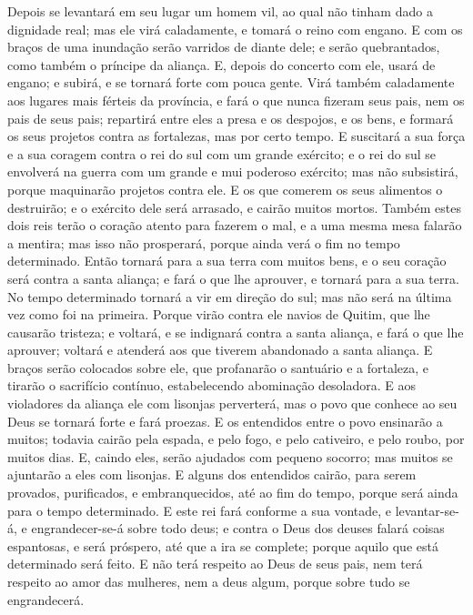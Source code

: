 Depois se levantará em seu lugar um homem vil, ao qual não tinham
dado a dignidade real; mas ele virá caladamente, e tomará o reino
com engano. E com os braços de uma inundação serão varridos
de diante dele; e serão quebrantados, como também o príncipe da
aliança. E, depois do concerto com ele, usará de engano; e
subirá, e se tornará forte com pouca gente. Virá também
caladamente aos lugares mais férteis da província, e fará o que
nunca fizeram seus pais, nem os pais de seus pais; repartirá entre
eles a presa e os despojos, e os bens, e formará os seus projetos
contra as fortalezas, mas por certo tempo. E suscitará a sua
força e a sua coragem contra o rei do sul com um grande exército; e
o rei do sul se envolverá na guerra com um grande e mui poderoso
exército; mas não subsistirá, porque maquinarão projetos contra ele.
E os que comerem os seus alimentos o destruirão; e o exército
dele será arrasado, e cairão muitos mortos. Também estes dois
reis terão o coração atento para fazerem o mal, e a uma mesma mesa
falarão a mentira; mas isso não prosperará, porque ainda verá o fim
no tempo determinado. Então tornará para a sua terra com
muitos bens, e o seu coração será contra a santa aliança; e fará o
que lhe aprouver, e tornará para a sua terra. No tempo
determinado tornará a vir em direção do sul; mas não será na última
vez como foi na primeira. Porque virão contra ele navios de
Quitim, que lhe causarão tristeza; e voltará, e se indignará contra
a santa aliança, e fará o que lhe aprouver; voltará e atenderá aos
que tiverem abandonado a santa aliança. E braços serão
colocados sobre ele, que profanarão o santuário e a fortaleza, e
tirarão o sacrifício contínuo, estabelecendo abominação desoladora.
E aos violadores da aliança ele com lisonjas perverterá, mas
o povo que conhece ao seu Deus se tornará forte e fará proezas.
E os entendidos entre o povo ensinarão a muitos; todavia
cairão pela espada, e pelo fogo, e pelo cativeiro, e pelo roubo, por
muitos dias. E, caindo eles, serão ajudados com pequeno
socorro; mas muitos se ajuntarão a eles com lisonjas. E
alguns dos entendidos cairão, para serem provados, purificados, e
embranquecidos, até ao fim do tempo, porque será ainda para o tempo
determinado. E este rei fará conforme a sua vontade, e
levantar-se-á, e engrandecer-se-á sobre todo deus; e contra o Deus
dos deuses falará coisas espantosas, e será próspero, até que a ira
se complete; porque aquilo que está determinado será feito. E
não terá respeito ao Deus de seus pais, nem terá respeito ao amor
das mulheres, nem a deus algum, porque sobre tudo se engrandecerá.
